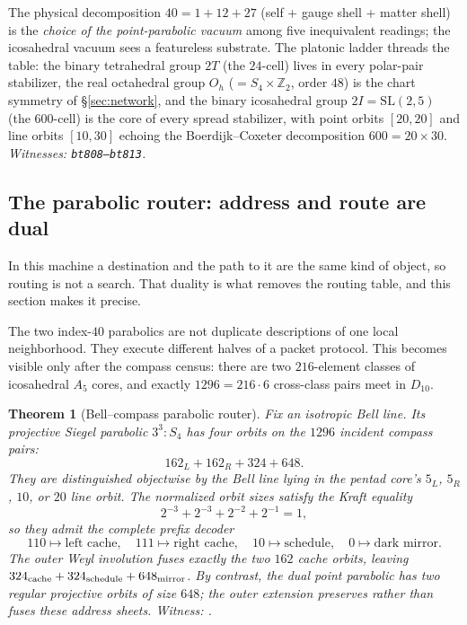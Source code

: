 \documentclass[11pt]{article}
\newtheorem{theorem}{Theorem}[section]
\begin{document}
The physical decomposition $40=1+12+27$ (self + gauge shell + matter
shell) is the \emph{choice of the point-parabolic vacuum} among five
inequivalent readings; the icosahedral vacuum sees a featureless
substrate.  The platonic ladder threads the table: the binary
tetrahedral group $2T$ (the $24$-cell) lives in every polar-pair
stabilizer, the real octahedral group $O_h$ ($=S_4\times\mathbb Z_2$,
order $48$) is the chart symmetry of \S\ref{sec:network}, and the
binary icosahedral group $2I=\mathrm{SL}(2,5)$ (the $600$-cell) is the
core of every spread stabilizer, with point orbits $[20,20]$ and line
orbits $[10,30]$ echoing the Boerdijk--Coxeter decomposition
$600=20\times 30$.
\emph{Witnesses: \texttt{bt808--bt813}.}

\subsection{The parabolic router: address and route are dual}

\begin{plainbox}
In this machine a destination and the path to it are the same kind of object, so
routing is not a search. That duality is what removes the routing table, and this section
makes it precise.
\end{plainbox}

\label{sec:parabolic-router}

The two index-$40$ parabolics are not duplicate descriptions of one
local neighborhood.  They execute different halves of a packet
protocol.  This becomes visible only after the compass census: there
are two $216$-element classes of icosahedral $A_5$ cores, and exactly
$1296=216\cdot6$ cross-class pairs meet in $D_{10}$.

\begin{theorem}[Bell--compass parabolic router]
\label{thm:parabolic-router}
Fix an isotropic Bell line.  Its projective Siegel parabolic
$3^3{:}S_4$ has four orbits on the $1296$ incident compass pairs:
\[
162_L+162_R+324+648.
\]
They are distinguished objectwise by the Bell line lying in the
pentad core's $5_L$, $5_R$, $10$, or $20$ line orbit.  The normalized
orbit sizes satisfy the Kraft equality
\[
2^{-3}+2^{-3}+2^{-2}+2^{-1}=1,
\]
so they admit the complete prefix decoder
\[
110\mapsto\text{left cache},\quad
111\mapsto\text{right cache},\quad
10\mapsto\text{schedule},\quad
0\mapsto\text{dark mirror}.
\]
The outer Weyl involution fuses exactly the two $162$ cache orbits,
leaving $324_{\rm cache}+324_{\rm schedule}+648_{\rm mirror}$.
By contrast, the dual point parabolic has two regular projective
orbits of size $648$; the outer extension preserves rather than fuses
these address sheets.
\emph{Witness: .}
\end{theorem}
\end{document}
